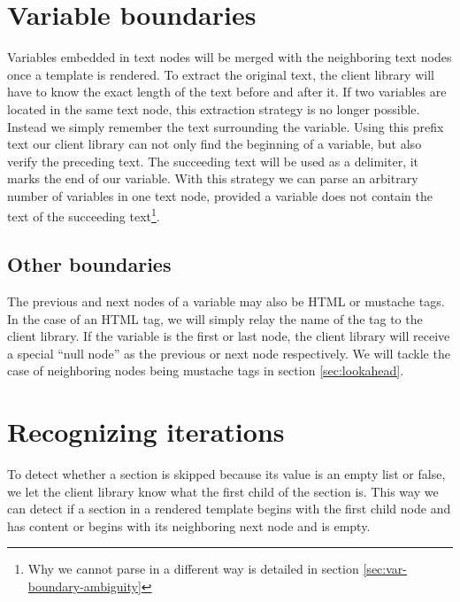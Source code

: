 \documentclass[thesis.tex]{subfiles}
\begin{document}
\section{Variable boundaries}
Variables embedded in text nodes will be merged with the neighboring text nodes
once a template is rendered. To extract the original text, the client library
will have to know the exact length of the text before and after it. If two
variables are located in the same text node, this extraction strategy is no
longer possible. Instead we simply remember the text surrounding the variable.
Using this prefix text our client library can not only find the beginning of a
variable, but also verify the preceding text. The succeeding text will be
used as a delimiter, it marks the end of our variable.
With this strategy we can parse an arbitrary number of variables in one text
node, provided a variable does not contain the text of the succeeding
text\footnote{Why we cannot parse in a different way is detailed in
section \ref{sec:var-boundary-ambiguity}}.

\subsection{Other boundaries}
The previous and next nodes of a variable may also be HTML or mustache tags.
In the case of an HTML tag, we will simply relay the name of the tag to the
client library. If the variable is the first or last node, the client library
will receive a special ``null node'' as the previous or next node respectively.
We will tackle the case of neighboring nodes being mustache tags in
section \ref{sec:lookahead}.

\section{Recognizing iterations}
To detect whether a section is skipped because its value is an empty
list or false, we let the client library know what the first child of the
section is.
This way we can detect if a section in a rendered template begins with the
first child node and has content or begins with its neighboring next node and is
empty.
\end{document}
